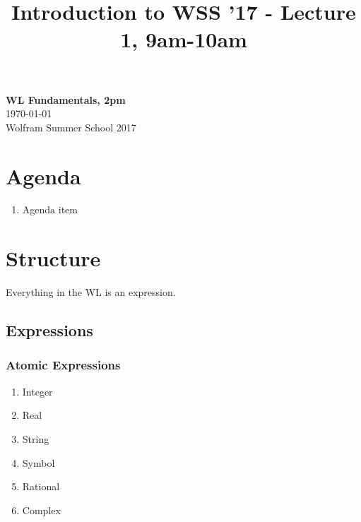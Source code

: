 \documentclass[11pt]{article}
\theoremstyle{definition}
\begin{document}
\title{Introduction to WSS '17 - Lecture 1, 9am-10am}

\thispagestyle{empty}
\begin{center}
{\LARGE \bf WL Fundamentals, 2pm}\\
\medskip
{\Large \today}\\
\smallskip
{\large Wolfram Summer School 2017}
\end{center}




\section*{Agenda}
\begin{enumerate}
\item Agenda item
\end{enumerate}

\noindent\hrulefill




\section{Structure}

Everything in the WL is an expression.

\subsection{Expressions}
\subsubsection{Atomic Expressions}

\begin{enumerate}
\item Integer
\item Real
\item String
\item Symbol
\item Rational
\item Complex
\end{enumerate}
\end{document}
